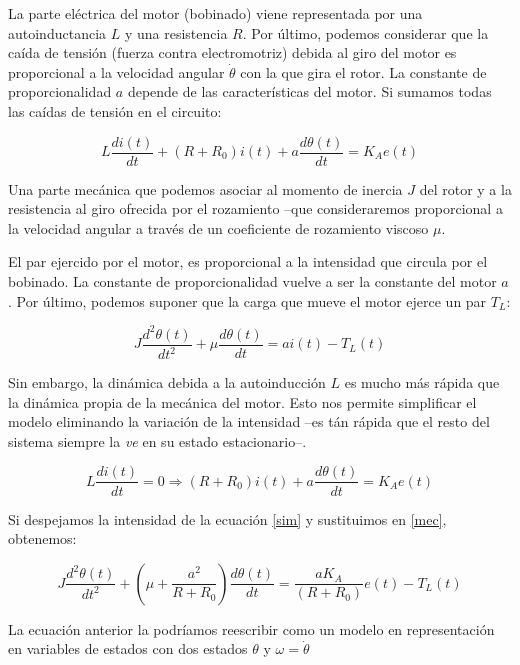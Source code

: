 \documentclass[10pt,a4paper]{report}
\begin{document}
 La parte eléctrica del motor (bobinado) viene representada por una autoinductancia $L$ y una resistencia $R$. Por último, podemos considerar que la caída de tensión (fuerza contra electromotriz) debida al giro del motor es proporcional a la velocidad angular $\dot{\theta}$ con la que gira el rotor.  La constante de proporcionalidad $a$ depende de las características del motor. Si sumamos todas las caídas de tensión en el circuito:


\begin{equation}\label{elc}
L\frac{di(t)}{dt}+(R+R_0)i(t)+a\frac{d\theta(t)}{dt} = K_Ae(t)
\end{equation}

Una parte mecánica que podemos asociar al momento de inercia $J$ del rotor y  a la resistencia al giro ofrecida por el rozamiento --que consideraremos proporcional a la velocidad angular a través de un coeficiente de rozamiento viscoso $\mu$. 

El par ejercido por el motor, es proporcional a la intensidad que circula por el bobinado. La constante de proporcionalidad vuelve a ser la constante del motor $a$. Por último, podemos suponer que la carga que mueve el motor ejerce un par $T_L$:

\begin{equation}\label{mec}
J\frac{d^2\theta(t)}{dt^2}+\mu\frac{d\theta(t)}{dt} = ai(t)-T_L(t)
\end{equation}

Sin embargo, la dinámica debida a la autoinducción $L$ es mucho más rápida que la dinámica propia de la mecánica del motor.  Esto nos permite simplificar el modelo eliminando la variación de la intensidad --es tán rápida que el resto del sistema siempre la \emph{ve} en su estado estacionario--.

 \begin{equation}\label{sim}
L\frac{di(t)}{dt}= 0 \Rightarrow (R+R_0)i(t)+a\frac{d\theta(t)}{dt} = K_Ae(t)
\end{equation}

Si despejamos la intensidad de la ecuación \ref{sim} y sustituimos en \ref{mec}, obtenemos:

\begin{equation}\label{s}
J\frac{d^2\theta(t)}{dt^2}+\left(\mu+\frac{a^2}{R+R_0}\right)\frac{d\theta(t)}{dt} = \frac{aK_A}{(R+R_0)}e(t)-T_L(t)
\end{equation}

La ecuación anterior la podríamos reescribir como un modelo en representación en variables de estados con dos estados $\theta$ y $\omega= \dot{\theta}$ 
\end{document}
